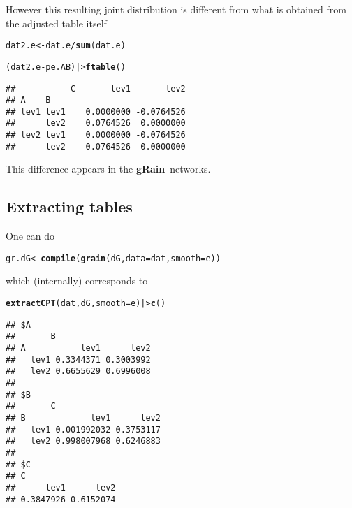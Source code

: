 \documentclass[10pt]{article}\usepackage[]{graphicx}\usepackage[]{xcolor}
\makeatletter
\newcommand{\hlopt}[1]{\textcolor[rgb]{0,0,0}{#1}}%
\newcommand{\hlstd}[1]{\textcolor[rgb]{0.345,0.345,0.345}{#1}}%
\newcommand{\hlkwb}[1]{\textcolor[rgb]{0.69,0.353,0.396}{#1}}%
\newcommand{\hlkwc}[1]{\textcolor[rgb]{0.333,0.667,0.333}{#1}}%
\newcommand{\hlkwd}[1]{\textcolor[rgb]{0.737,0.353,0.396}{\textbf{#1}}}%
\newenvironment{kframe}{%
 \def\at@end@of@kframe{}%
 \ifinner\ifhmode%
  \def\at@end@of@kframe{\end{minipage}}%
  \begin{minipage}{\columnwidth}%
 \fi\fi%
 \def\FrameCommand##1{\hskip\@totalleftmargin \hskip-\fboxsep
 \colorbox{shadecolor}{##1}\hskip-\fboxsep
     \hskip-\linewidth \hskip-\@totalleftmargin \hskip\columnwidth}%
 \MakeFramed {\advance\hsize-\width
   \@totalleftmargin\z@ \linewidth\hsize
   \@setminipage}}%
 {\par\unskip\endMakeFramed%
 \at@end@of@kframe}
\newenvironment{knitrout}{}{} %
\def\grbn{{\bf gRain}}
\makeatother
\begin{document}
However this resulting joint distribution is different from what is
obtained from the adjusted table itself
\begin{knitrout}
\color{fgcolor}\begin{kframe}
\begin{alltt}
\hlstd{dat2.e} \hlkwb{<-} \hlstd{dat.e} \hlopt{/} \hlkwd{sum}\hlstd{(dat.e)}
\end{alltt}
\end{kframe}
\end{knitrout}

\begin{knitrout}
\color{fgcolor}\begin{kframe}
\begin{alltt}
\hlstd{(dat2.e} \hlopt{-} \hlstd{pe.AB)  |>} \hlkwd{ftable}\hlstd{()}
\end{alltt}
\begin{verbatim}
##           C       lev1       lev2
## A    B                           
## lev1 lev1    0.0000000 -0.0764526
##      lev2    0.0764526  0.0000000
## lev2 lev1    0.0000000 -0.0764526
##      lev2    0.0764526  0.0000000
\end{verbatim}
\end{kframe}
\end{knitrout}
This difference appears in the \grbn\ networks.

\subsection{Extracting tables}
\label{sec:extracting-tables}

One can do
\begin{knitrout}
\color{fgcolor}\begin{kframe}
\begin{alltt}
\hlstd{gr.dG} \hlkwb{<-} \hlkwd{compile}\hlstd{(}\hlkwd{grain}\hlstd{(dG,} \hlkwc{data}\hlstd{=dat,} \hlkwc{smooth}\hlstd{=e))}
\end{alltt}
\end{kframe}
\end{knitrout}

which (internally) corresponds to
\begin{knitrout}
\color{fgcolor}\begin{kframe}
\begin{alltt}
\hlkwd{extractCPT}\hlstd{(dat, dG,} \hlkwc{smooth}\hlstd{=e)  |>} \hlkwd{c}\hlstd{()}
\end{alltt}
\begin{verbatim}
## $A
##       B
## A           lev1      lev2
##   lev1 0.3344371 0.3003992
##   lev2 0.6655629 0.6996008
## 
## $B
##       C
## B             lev1      lev2
##   lev1 0.001992032 0.3753117
##   lev2 0.998007968 0.6246883
## 
## $C
## C
##      lev1      lev2 
## 0.3847926 0.6152074
\end{verbatim}
\end{kframe}
\end{knitrout}
\end{document}
